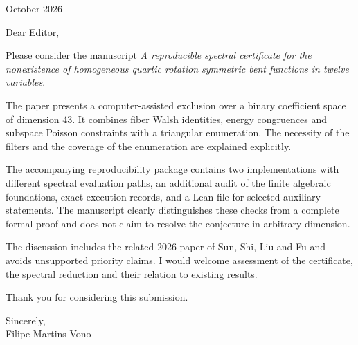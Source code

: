 \documentclass[11pt,a4paper]{article}
\begin{document}
 October 2026
\bigskip

\noindent Dear Editor,
\medskip

Please consider the manuscript \emph{A reproducible spectral certificate
for the nonexistence of homogeneous quartic rotation symmetric bent
functions in twelve variables}.

The paper presents a computer-assisted exclusion over a binary
coefficient space of dimension 43. It combines fiber Walsh identities,
energy congruences and subspace Poisson constraints with a triangular
enumeration. The necessity of the filters and the coverage of the
enumeration are explained explicitly.

The accompanying reproducibility package contains two implementations
with different spectral evaluation paths, an additional audit of the
finite algebraic foundations, exact execution records, and a Lean file
for selected auxiliary statements. The manuscript clearly distinguishes
these checks from a complete formal proof and does not claim to resolve
the conjecture in arbitrary dimension.

The discussion includes the related 2026 paper of Sun, Shi, Liu and Fu
and avoids unsupported priority claims. I would welcome assessment of
the certificate, the spectral reduction and their relation to existing
results.

Thank you for considering this submission.
\bigskip

\noindent Sincerely,\\
Filipe Martins Vono
\end{document}
